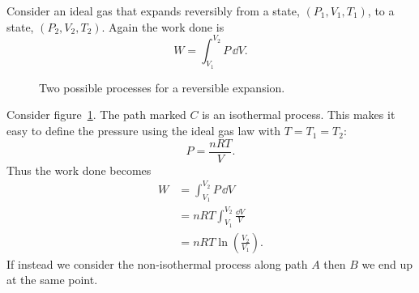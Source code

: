     \begin{example}\label{exa:reversible ideal gas expansion}
        Consider an ideal gas that expands reversibly from a state, \((P_1, V_1, T_1)\), to a state, \((P_2, V_2, T_2)\).
        Again the work done is
        \[W = \int_{V_1}^{V_2}P\,\dd{V}.\]
        \begin{figure}[ht]
            \centering
            \caption{Two possible processes for a reversible expansion.}
            \label{fig:reversible ideal gas expansion}
        \end{figure}
        Consider figure~\ref{fig:reversible ideal gas expansion}.
        The path marked \(C\) is an isothermal process.
        This makes it easy to define the pressure using the ideal gas law with \(T = T_1 = T_2\):
        \[P = \frac{nRT}{V}.\]
        Thus the work done becomes
        \begin{align*}
            W &= \int_{V_1}^{V_2}P\,\dd{V}\\
            &= nRT\int_{V_1}^{V_2}\frac{\dd{V}}{V}\\
            &= nRT\ln\left(\frac{V_2}{V_1}\right).
        \end{align*}
        If instead we consider the non-isothermal process along path \(A\) then \(B\) we end up at the same point.

\end{example}
